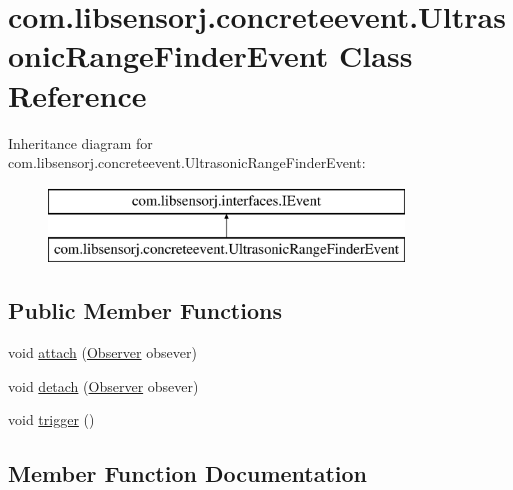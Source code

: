 \hypertarget{classcom_1_1libsensorj_1_1concreteevent_1_1UltrasonicRangeFinderEvent}{}\section{com.\+libsensorj.\+concreteevent.\+Ultrasonic\+Range\+Finder\+Event Class Reference}
\label{classcom_1_1libsensorj_1_1concreteevent_1_1UltrasonicRangeFinderEvent}
Inheritance diagram for com.\+libsensorj.\+concreteevent.\+Ultrasonic\+Range\+Finder\+Event\+:\begin{figure}[H]
\begin{center}
\leavevmode
\includegraphics[height=2.000000cm]{classcom_1_1libsensorj_1_1concreteevent_1_1UltrasonicRangeFinderEvent}
\end{center}
\end{figure}
\subsection*{Public Member Functions}
\begin{DoxyCompactItemize}
\item 
void \hyperlink{classcom_1_1libsensorj_1_1concreteevent_1_1UltrasonicRangeFinderEvent_a0b32d3efeb55247269b4f43e4e34fe8e}{attach} (\hyperlink{classcom_1_1libsensorj_1_1model_1_1Observer}{Observer} obsever)
\item 
void \hyperlink{classcom_1_1libsensorj_1_1concreteevent_1_1UltrasonicRangeFinderEvent_ab0647f65e87ff07f61b3e4fe7e1daa19}{detach} (\hyperlink{classcom_1_1libsensorj_1_1model_1_1Observer}{Observer} obsever)
\item 
void \hyperlink{classcom_1_1libsensorj_1_1concreteevent_1_1UltrasonicRangeFinderEvent_a4d1ba316d1d324c4fb6e321e4c7a7b6e}{trigger} ()
\end{DoxyCompactItemize}


\subsection{Member Function Documentation}
\hypertarget{classcom_1_1libsensorj_1_1concreteevent_1_1UltrasonicRangeFinderEvent_a0b32d3efeb55247269b4f43e4e34fe8e}{}
